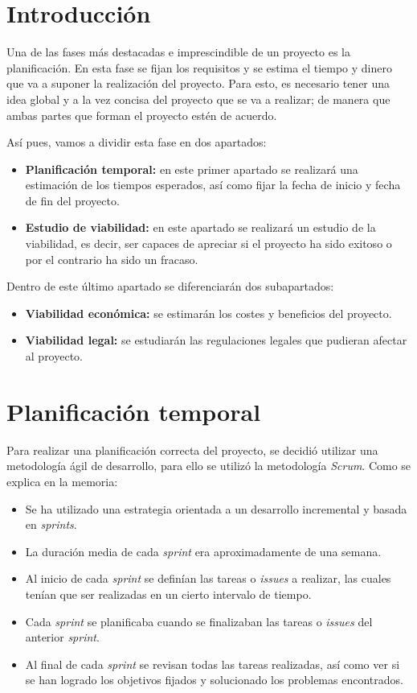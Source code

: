 
\section{Introducción}
Una de las fases más destacadas e imprescindible de un proyecto es la planificación. En esta fase se fijan los requisitos y se estima el tiempo y dinero que va a suponer la realización del proyecto.
Para esto, es necesario tener una idea global y a la vez concisa del proyecto que se va a realizar; de manera que ambas partes que forman el proyecto estén de acuerdo.

Así pues, vamos a dividir esta fase en dos apartados:

\begin{itemize}
\item
\textbf{Planificación temporal:} en este primer apartado se realizará una estimación de los tiempos esperados, así como fijar la fecha de inicio y fecha de fin del proyecto.
\item
\textbf{Estudio de viabilidad:} en este apartado se realizará un estudio de la viabilidad, es decir, ser capaces de apreciar si el proyecto ha sido exitoso o por el contrario ha sido un fracaso. 
\end{itemize}

Dentro de este último apartado se diferenciarán dos subapartados:

\begin{itemize}
\item
\textbf{Viabilidad económica:} se estimarán los costes y beneficios del proyecto.
\item
\textbf{Viabilidad legal:} se estudiarán las regulaciones legales que pudieran afectar al proyecto.
\end{itemize}


\section{Planificación temporal}
Para realizar una planificación correcta del proyecto, se decidió utilizar una metodología ágil de desarrollo, para ello se utilizó la metodología \emph{Scrum}. Como se explica en la memoria:

\begin{itemize}
	\item Se ha utilizado una estrategia orientada a un desarrollo incremental y basada en \emph{sprints}.
	\item La duración media de cada \emph{sprint} era aproximadamente de una semana.
	\item Al inicio de cada \emph{sprint} se definían las tareas o \emph{issues} a realizar, las cuales tenían que ser realizadas en un cierto intervalo de tiempo.
	\item Cada \emph{sprint} se planificaba cuando se finalizaban las tareas o \emph{issues} del anterior \emph{sprint}.	
	\item Al final de cada \emph{sprint} se revisan todas las tareas realizadas, así como ver si se han logrado los objetivos fijados y solucionado los problemas encontrados.
\end{itemize}

